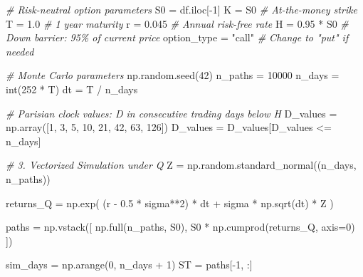 \documentclass[
  11pt,
]{article}
\newenvironment{Shaded}{}{}
\newcommand{\BuiltInTok}[1]{\textcolor[rgb]{0.00,0.50,0.00}{#1}}
\newcommand{\CommentTok}[1]{\textcolor[rgb]{0.38,0.63,0.69}{\textit{#1}}}
\newcommand{\DecValTok}[1]{\textcolor[rgb]{0.25,0.63,0.44}{#1}}
\newcommand{\FloatTok}[1]{\textcolor[rgb]{0.25,0.63,0.44}{#1}}
\newcommand{\NormalTok}[1]{#1}
\newcommand{\OperatorTok}[1]{\textcolor[rgb]{0.40,0.40,0.40}{#1}}
\newcommand{\StringTok}[1]{\textcolor[rgb]{0.25,0.44,0.63}{#1}}
\begin{document}
\begin{Shaded}
\begin{Highlighting}[]
\CommentTok{\# Risk{-}neutral option parameters}
\NormalTok{S0 }\OperatorTok{=}\NormalTok{ df.iloc[}\OperatorTok{{-}}\DecValTok{1}\NormalTok{]}
\NormalTok{K }\OperatorTok{=}\NormalTok{ S0                       }\CommentTok{\# At{-}the{-}money strike}
\NormalTok{T }\OperatorTok{=} \FloatTok{1.0}                       \CommentTok{\# 1 year maturity}
\NormalTok{r }\OperatorTok{=} \FloatTok{0.045}                     \CommentTok{\# Annual risk{-}free rate}
\NormalTok{H }\OperatorTok{=} \FloatTok{0.95} \OperatorTok{*}\NormalTok{ S0                 }\CommentTok{\# Down barrier: 95\% of current price}
\NormalTok{option\_type }\OperatorTok{=} \StringTok{"call"}          \CommentTok{\# Change to "put" if needed}

\CommentTok{\# Monte Carlo parameters}
\NormalTok{np.random.seed(}\DecValTok{42}\NormalTok{)}
\NormalTok{n\_paths }\OperatorTok{=} \DecValTok{10000}
\NormalTok{n\_days }\OperatorTok{=} \BuiltInTok{int}\NormalTok{(}\DecValTok{252} \OperatorTok{*}\NormalTok{ T)}
\NormalTok{dt }\OperatorTok{=}\NormalTok{ T }\OperatorTok{/}\NormalTok{ n\_days}

\CommentTok{\# Parisian clock values: D in consecutive trading days below H}
\NormalTok{D\_values }\OperatorTok{=}\NormalTok{ np.array([}\DecValTok{1}\NormalTok{, }\DecValTok{3}\NormalTok{, }\DecValTok{5}\NormalTok{, }\DecValTok{10}\NormalTok{, }\DecValTok{21}\NormalTok{, }\DecValTok{42}\NormalTok{, }\DecValTok{63}\NormalTok{, }\DecValTok{126}\NormalTok{])}
\NormalTok{D\_values }\OperatorTok{=}\NormalTok{ D\_values[D\_values }\OperatorTok{\textless{}=}\NormalTok{ n\_days]}

\CommentTok{\# 3. Vectorized Simulation under Q}
\NormalTok{Z }\OperatorTok{=}\NormalTok{ np.random.standard\_normal((n\_days, n\_paths))}

\NormalTok{returns\_Q }\OperatorTok{=}\NormalTok{ np.exp(}
\NormalTok{    (r }\OperatorTok{{-}} \FloatTok{0.5} \OperatorTok{*}\NormalTok{ sigma}\OperatorTok{**}\DecValTok{2}\NormalTok{) }\OperatorTok{*}\NormalTok{ dt }\OperatorTok{+}\NormalTok{ sigma }\OperatorTok{*}\NormalTok{ np.sqrt(dt) }\OperatorTok{*}\NormalTok{ Z}
\NormalTok{)}

\NormalTok{paths }\OperatorTok{=}\NormalTok{ np.vstack([}
\NormalTok{    np.full(n\_paths, S0),}
\NormalTok{    S0 }\OperatorTok{*}\NormalTok{ np.cumprod(returns\_Q, axis}\OperatorTok{=}\DecValTok{0}\NormalTok{)}
\NormalTok{])}

\NormalTok{sim\_days }\OperatorTok{=}\NormalTok{ np.arange(}\DecValTok{0}\NormalTok{, n\_days }\OperatorTok{+} \DecValTok{1}\NormalTok{)}
\NormalTok{ST }\OperatorTok{=}\NormalTok{ paths[}\OperatorTok{{-}}\DecValTok{1}\NormalTok{, :]}


\end{Highlighting}
\end{Shaded}
\end{document}
